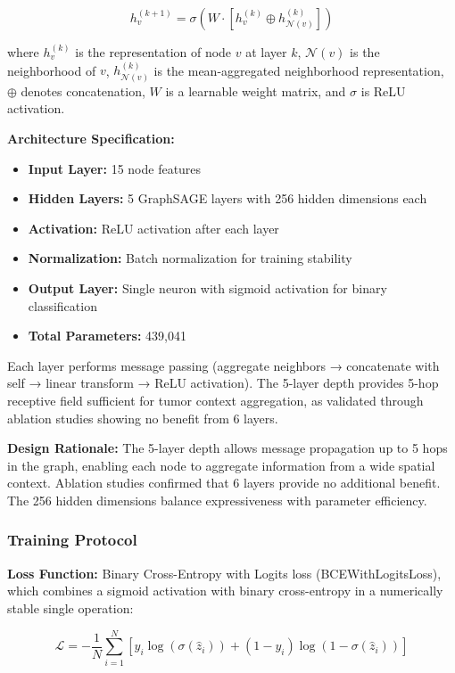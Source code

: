 \begin{equation}
h_v^{(k+1)} = \sigma \left( W \cdot \left[ h_v^{(k)} \oplus h_{\mathcal{N}(v)}^{(k)} \right] \right)
\end{equation}

where $h_v^{(k)}$ is the representation of node $v$ at layer $k$, $\mathcal{N}(v)$ is the neighborhood of $v$, $h_{\mathcal{N}(v)}^{(k)}$ is the mean-aggregated neighborhood representation, $\oplus$ denotes concatenation, $W$ is a learnable weight matrix, and $\sigma$ is ReLU activation.

\textbf{Architecture Specification:}
\begin{itemize}
    \item \textbf{Input Layer:} 15 node features
    \item \textbf{Hidden Layers:} 5 GraphSAGE layers with 256 hidden dimensions each
    \item \textbf{Activation:} ReLU activation after each layer
    \item \textbf{Normalization:} Batch normalization for training stability
    \item \textbf{Output Layer:} Single neuron with sigmoid activation for binary classification
    \item \textbf{Total Parameters:} 439,041
\end{itemize}


Each layer performs message passing (aggregate neighbors → concatenate with self → linear transform → ReLU activation). The 5-layer depth provides 5-hop receptive field sufficient for tumor context aggregation, as validated through ablation studies showing no benefit from 6 layers.

\textbf{Design Rationale:} The 5-layer depth allows message propagation up to 5 hops in the graph, enabling each node to aggregate information from a wide spatial context. Ablation studies confirmed that 6 layers provide no additional benefit. The 256 hidden dimensions balance expressiveness with parameter efficiency.

\subsubsection{Training Protocol}

\textbf{Loss Function:} Binary Cross-Entropy with Logits loss (BCEWithLogitsLoss), which combines a sigmoid activation with binary cross-entropy in a numerically stable single operation:

\begin{equation}
\mathcal{L} = -\frac{1}{N} \sum_{i=1}^{N} \left[ y_i \log(\sigma(\hat{z}_i)) + (1-y_i) \log(1-\sigma(\hat{z}_i)) \right]
\end{equation}


